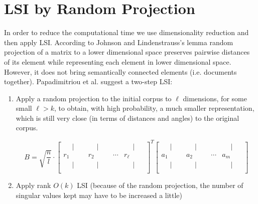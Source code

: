 \documentclass[a4paper,11pt,DIV=15]{scrartcl} %
\theoremstyle{plain}
\theoremstyle{definition}
\begin{document}
\section{LSI by Random Projection} %
In order to reduce the computational time we use dimensionality reduction and then apply LSI.
According to Johnson and Lindenstrauss's lemma \cite{johnson1984Lindenstrauss}  random projection of a matrix to a lower dimensional space preserves pairwise distances of its element while representing each element in lower dimensional space. However, it does not bring semantically connected elements (i.e. documents together).  Papadimitriou et al. suggest a two-step LSI:
\begin{enumerate}
    \item  Apply a random projection to the initial corpus to $\ell$ dimensions, for some
small $\ell > k$, to obtain, with high probability, a much smaller representation, which
is still very close (in terms of distances and angles) to the original corpus.


\begin{equation}
    B = 
\sqrt{\dfrac{n}{l}}
\cdot
\begin{bmatrix}
    \phantom{-} \big\lvert \phantom{-} & \phantom{-} \vert \phantom{-} & & \phantom{-} \vert \phantom{-} \\
    r_1 & r_2 & \cdots & r_{\ell} \\
    \phantom{-} \vert \phantom{-} & \phantom{-} \vert \phantom{-} & & \phantom{-} \vert \phantom{-} \\
\end{bmatrix}^T
\begin{bmatrix}
    \phantom{-} \big\lvert \phantom{-} & \phantom{-} \vert \phantom{-} & & \phantom{-} \vert \phantom{-} \\
    a_1 & a_2 & \cdots & a_m \\
    \phantom{-} \vert \phantom{-} & \phantom{-} \vert \phantom{-} & & \phantom{-} \vert \phantom{-} \\
\end{bmatrix}
\label{eq:matrixB}
\end{equation}

\item Apply rank $O(k)$ LSI (because of the random projection, the number of
singular values kept may have to be increased a little)
\end{enumerate}
\end{document}
